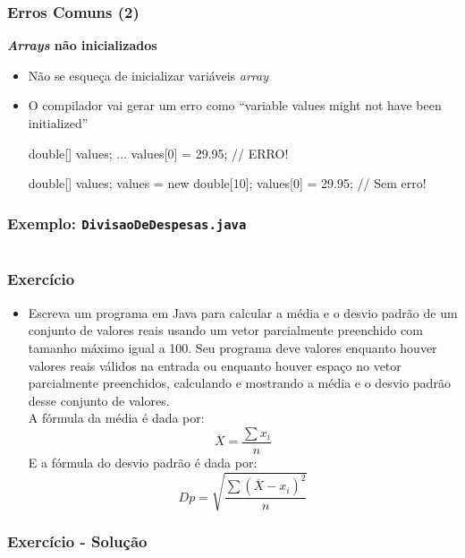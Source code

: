 \documentclass[xcolor={dvipsnames,table},aspectratio=169]{beamer}
\begin{document}
\begin{frame}[fragile]\frametitle{Erros Comuns (2)}
\textbf{\emph{Arrays} não inicializados}
\begin{itemize}
	\item Não se esqueça de inicializar variáveis \emph{array}
	\item O compilador vai gerar um erro como ``variable values might not have been initialized''
{\footnotesize
\begin{javacode}
double[] values;
...
values[0] = 29.95; // ERRO!
\end{javacode}
\begin{javacode}
double[] values;
values = new double[10];
values[0] = 29.95; // Sem erro!
\end{javacode}
}
\end{itemize}
\end{frame}

\begin{frame}[fragile]\frametitle{Exemplo: \texttt{DivisaoDeDespesas.java}}
{\tiny\inputminted[bgcolor=cyan!10]{java}{src/DivisaoDeDespesas.java}}
\end{frame}

\begin{frame}[fragile]\frametitle{Exercício}
\begin{itemize}
	\item Escreva um programa em Java para calcular a média e o desvio padrão de um conjunto de valores reais usando um vetor parcialmente preenchido com tamanho máximo igual a 100. Seu programa deve valores enquanto houver valores reais válidos na entrada ou enquanto houver espaço no vetor parcialmente preenchidos, calculando e mostrando a média e o desvio padrão desse conjunto de valores.\\
A fórmula da média é dada por:
\[ \overline{X} = \frac{\sum{x_i}}{n} \]
E a fórmula do desvio padrão é dada por:
\[ Dp = \sqrt{ \frac{ \sum{(\overline{X}-x_i)^2} }{n} } \]
\end{itemize}
\end{frame}

\begin{frame}[fragile]\frametitle{Exercício - Solução}
{\tiny\inputminted[bgcolor=cyan!10]{java}{src/DesvioPadrao.java}}
\end{frame}
\end{document}

